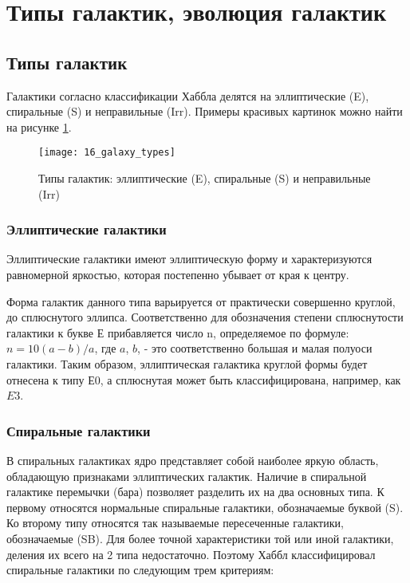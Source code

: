 \section{Типы галактик, эволюция галактик}

\subsection{Типы галактик}

Галактики согласно классификации Хаббла делятся на эллиптические (E), спиральные (S) и неправильные (Irr). Примеры красивых картинок можно найти на рисунке \ref{fig:16_galaxy_types}.

\begin{figure}[H]
	\centering
	\texttt{[image: 16\_galaxy\_types]}
	\caption{Типы галактик: эллиптические (E), спиральные (S) и неправильные (Irr)}
	\label{fig:16_galaxy_types}
\end{figure}

\subsubsection{Эллиптические галактики}

Эллиптические галактики имеют эллиптическую форму и характеризуются равномерной яркостью, которая постепенно убывает от края к центру.

Форма галактик данного типа варьируется от практически совершенно круглой, до сплюснутого эллипса. Соответственно для обозначения степени сплюснутости галактики к букве Е прибавляется число n, определяемое по формуле: $n = 10 (a - b) / a$, где $ a$, $b$, - это соответственно большая и малая полуоси галактики. Таким образом, эллиптическая галактика круглой формы будет отнесена к типу Е0, а сплюснутая может быть классифицирована, например, как $E3$.

\subsubsection{Спиральные галактики}

В спиральных галактиках ядро представляет собой наиболее яркую область, обладающую признаками эллиптических галактик. Наличие в спиральной галактике перемычки (бара) позволяет разделить их на два основных типа. К первому относятся нормальные спиральные галактики, обозначаемые буквой (S). Ко второму типу относятся так называемые пересеченные галактики, обозначаемые (SB). Для более точной характеристики той или иной галактики, деления их всего на 2 типа недостаточно. Поэтому Хаббл классифицировал спиральные галактики по следующим трем критериям:

